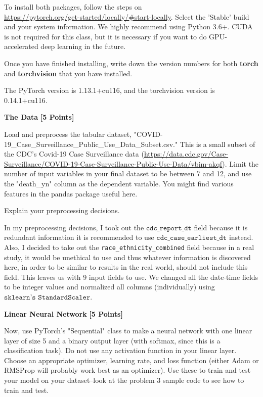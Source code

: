 To install both packages, follow the steps on \\
\url{https://pytorch.org/get-started/locally/#start-locally}. Select the 'Stable' build and your system information. We highly recommend using Python 3.6+. CUDA is not required for this class, but it is necessary if you want to do GPU-accelerated deep learning in the future.

Once you have finished installing, write down the version numbers for both \textbf{torch} and \textbf{torchvision} that you have installed.

\begin{solution}
  The PyTorch version is 1.13.1+cu116, and the torchvision version is 0.14.1+cu116.
\end{solution}

\problem \textbf{The Data} \textbf{[5 Points]}

Load and preprocess the tabular dataset, "COVID-19\_Case\_Surveillance\_Public\_Use\_Data\_Subset.csv." This is a small subset of the CDC's Covid-19 Case Surveillance data (\url{https://data.cdc.gov/Case-Surveillance/COVID-19-Case-Surveillance-Public-Use-Data/vbim-akqf}). Limit the number of input variables in your final dataset to be between 7 and 12, and use the "death\_yn" column as the dependent variable. You might find various features in the pandas package useful here.

Explain your preprocessing decisions.

\begin{solution}
  In my preprocessing decisions, I took out the $\texttt{cdc_report_dt}$ field because it is redundant information it is recommended to use $\texttt{cdc_case_earliest_dt}$ instead. Also, I decided to take out the \texttt{race_ethnicity_combined} field because in a real study, it would be unethical to use and thus whatever information is discovered here, in order to be similar to results in the real world, should not include this field. This leaves us with 9 input fields to use. We changed all the date-time fields to be integer values and normalized all columns (individually) using $\texttt{sklearn's StandardScaler}$.
\end{solution}


\problem \textbf{Linear Neural Network} \textbf{[5 Points]}

Now, use PyTorch's "Sequential" class to make a neural network with one linear layer of size 5 and a binary output layer (with softmax, since this is a classification task). Do not use any activation function in your linear layer. Choose an appropriate optimizer, learning rate, and loss function (either Adam or RMSProp will probably work best as an optimizer). Use these to train and test your model on your dataset--look at the problem 3 sample code to see how to train and test.


